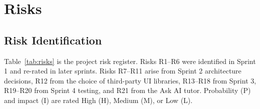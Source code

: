 \documentclass[12pt,letterpaper]{article}
\begin{document}
\section{Risks}\label{sec:risks}

\subsection{Risk Identification}
Table~\ref{tab:risks} is the project risk register. Risks R1--R6 were identified in
Sprint 1 and re-rated in later sprints. Risks R7--R11 arise from Sprint 2 architecture
decisions, R12 from the choice of third-party UI libraries, R13--R18 from Sprint 3,
R19--R20 from Sprint 4 testing, and R21 from the Ask AI tutor. Probability (P) and impact (I) are rated High (H), Medium (M), or Low (L).
\end{document}
